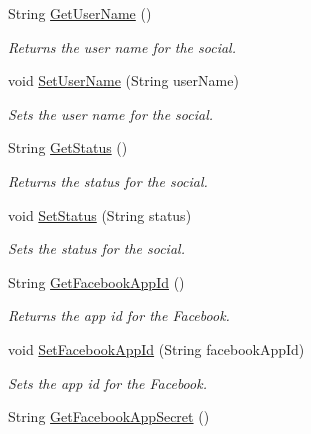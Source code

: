 \begin{DoxyCompactItemize}
\item 
String \hyperlink{classcom_1_1shephertz_1_1app42_1_1paas_1_1sdk_1_1windows_1_1social_1_1_social_a305797f145f76bcf0ab8b8576445dfbc}{Get\+User\+Name} ()
\begin{DoxyCompactList}\small\item\em Returns the user name for the social. \end{DoxyCompactList}\item 
void \hyperlink{classcom_1_1shephertz_1_1app42_1_1paas_1_1sdk_1_1windows_1_1social_1_1_social_ab51deb0dd9efdcf6b6261435d2909afe}{Set\+User\+Name} (String user\+Name)
\begin{DoxyCompactList}\small\item\em Sets the user name for the social. \end{DoxyCompactList}\item 
String \hyperlink{classcom_1_1shephertz_1_1app42_1_1paas_1_1sdk_1_1windows_1_1social_1_1_social_ab290499e1c6c61d0a02ac279c44f4822}{Get\+Status} ()
\begin{DoxyCompactList}\small\item\em Returns the status for the social. \end{DoxyCompactList}\item 
void \hyperlink{classcom_1_1shephertz_1_1app42_1_1paas_1_1sdk_1_1windows_1_1social_1_1_social_aca229504b0dc7daa543b50efbb01b156}{Set\+Status} (String status)
\begin{DoxyCompactList}\small\item\em Sets the status for the social. \end{DoxyCompactList}\item 
String \hyperlink{classcom_1_1shephertz_1_1app42_1_1paas_1_1sdk_1_1windows_1_1social_1_1_social_a5112191cb1d9c1cf0bb3c950f9b185a5}{Get\+Facebook\+App\+Id} ()
\begin{DoxyCompactList}\small\item\em Returns the app id for the Facebook. \end{DoxyCompactList}\item 
void \hyperlink{classcom_1_1shephertz_1_1app42_1_1paas_1_1sdk_1_1windows_1_1social_1_1_social_ae793a1a05245f54cd19ef81666e9b001}{Set\+Facebook\+App\+Id} (String facebook\+App\+Id)
\begin{DoxyCompactList}\small\item\em Sets the app id for the Facebook. \end{DoxyCompactList}\item 
String \hyperlink{classcom_1_1shephertz_1_1app42_1_1paas_1_1sdk_1_1windows_1_1social_1_1_social_a7d6e1d1f520e70f5125963283d53fadb}{Get\+Facebook\+App\+Secret} ()

\end{DoxyCompactItemize}
